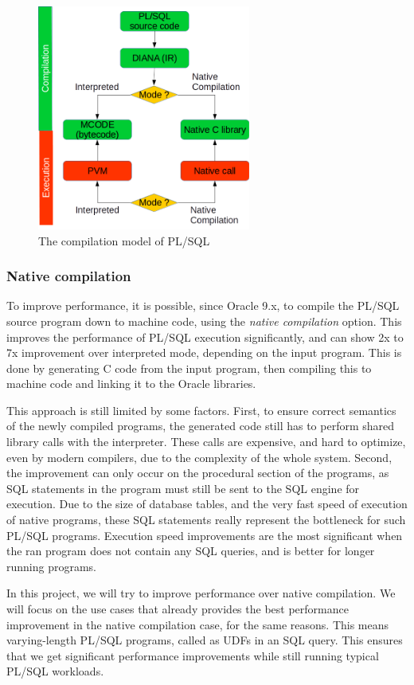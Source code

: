 \documentclass[twoside,11pt,a4paper]{article}
\begin{document}
\begin{figure}[bt]
	\centering
	\includegraphics[width=7cm]{./graphs/CompilationModel.png}
	\caption{The compilation model of PL/SQL}
\end{figure}

\subsubsection{Native compilation}

To improve performance, it is possible, since Oracle 9.x, to compile the PL/SQL source program down to machine code, using the \textit{native compilation} option. This improves the performance of PL/SQL execution significantly, and can show 2x to 7x improvement over interpreted mode, depending on the input program. This is done by generating C code from the input program, then compiling this to machine code and linking it to the Oracle libraries.

This approach is still limited by some factors. First, to ensure correct semantics of the newly compiled programs, the generated code still has to perform shared library calls with the interpreter. These calls are expensive, and hard to optimize, even by modern compilers, due to the complexity of the whole system. Second, the improvement can only occur on the procedural section of the programs, as SQL statements in the program must still be sent to the SQL engine for execution. Due to the size of database tables, and the very fast speed of execution of native programs, these SQL statements really represent the bottleneck for such PL/SQL programs. Execution speed improvements are the most significant when the ran program does not contain any SQL queries, and is better for longer running programs.

In this project, we will try to improve performance over native compilation. We will focus on the use cases that already provides the best performance improvement in the native compilation case, for the same reasons. This means varying-length PL/SQL programs, called as UDFs in an SQL query. This ensures that we get significant performance improvements while still running typical PL/SQL workloads.
\end{document}
